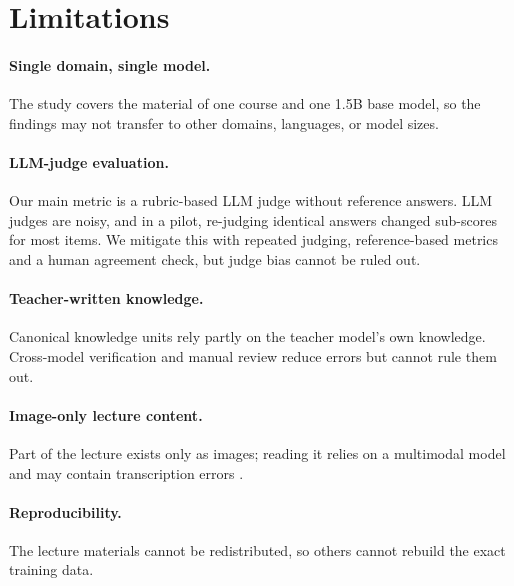 \section*{Limitations}

\paragraph{Single domain, single model.}
The study covers the material of one course and one 1.5B base model, so the findings may not transfer to other domains, languages, or model sizes.

\paragraph{LLM-judge evaluation.}
Our main metric is a rubric-based LLM judge without reference answers.
LLM judges are noisy, and in a pilot, re-judging identical answers changed sub-scores for most items.
We mitigate this with repeated judging, reference-based metrics and a human agreement check, but judge bias cannot be ruled out.

\paragraph{Teacher-written knowledge.}
Canonical knowledge units rely partly on the teacher model's own knowledge.
Cross-model verification and manual review reduce errors but cannot rule them out.

\paragraph{Image-only lecture content.}
Part of the lecture exists only as images; reading it relies on a multimodal model and may contain transcription errors .

\paragraph{Reproducibility.}
The lecture materials cannot be redistributed, so others cannot rebuild the exact training data.

